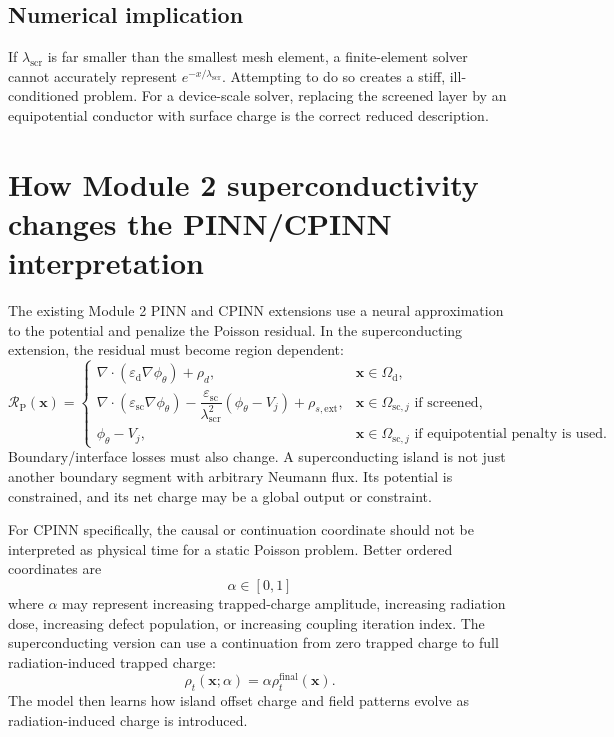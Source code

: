\documentclass[11pt]{article}
\newcommand{\Omd}{\Omega_{\mathrm{d}}}
\newcommand{\epsd}{\varepsilon_{\mathrm{d}}}
\newcommand{\epssc}{\varepsilon_{\mathrm{sc}}}
\newcommand{\lams}{\lambda_{\mathrm{scr}}}
\newcommand{\Rpoisson}{\mathcal{R}_{\mathrm{P}}}
\begin{document}
\subsection{Numerical implication}

If $\lams$ is far smaller than the smallest mesh element, a finite-element solver cannot accurately represent $e^{-x/\lams}$. Attempting to do so creates a stiff, ill-conditioned problem. For a device-scale solver, replacing the screened layer by an equipotential conductor with surface charge is the correct reduced description.

\section{How Module 2 superconductivity changes the PINN/CPINN interpretation}

The existing Module 2 PINN and CPINN extensions use a neural approximation to the potential and penalize the Poisson residual. In the superconducting extension, the residual must become region dependent:
\begin{equation}
\Rpoisson(\mathbf{x})=
\begin{cases}
\nabla\cdot(\epsd\nabla\phi_\theta)+\rho_d, & \mathbf{x}\in\Omd,\\[0.6em]
\nabla\cdot(\epssc\nabla\phi_\theta)-\dfrac{\epssc}{\lams^2}(\phi_\theta-V_j)+\rho_{s,\mathrm{ext}}, & \mathbf{x}\in\Omega_{\mathrm{sc},j} \text{ if screened},\\[0.8em]
\phi_\theta-V_j, & \mathbf{x}\in\Omega_{\mathrm{sc},j} \text{ if equipotential penalty is used}.
\end{cases}
\end{equation}
Boundary/interface losses must also change. A superconducting island is not just another boundary segment with arbitrary Neumann flux. Its potential is constrained, and its net charge may be a global output or constraint.

For CPINN specifically, the causal or continuation coordinate should not be interpreted as physical time for a static Poisson problem. Better ordered coordinates are
\begin{equation}
\alpha\in[0,1]
\end{equation}
where $\alpha$ may represent increasing trapped-charge amplitude, increasing radiation dose, increasing defect population, or increasing coupling iteration index. The superconducting version can use a continuation from zero trapped charge to full radiation-induced trapped charge:
\begin{equation}
\rho_t(\mathbf{x};\alpha)=\alpha\rho_t^{\mathrm{final}}(\mathbf{x}).
\end{equation}
The model then learns how island offset charge and field patterns evolve as radiation-induced charge is introduced.
\end{document}
